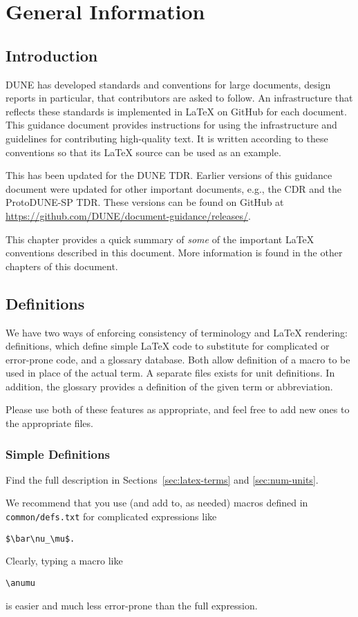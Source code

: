 \chapter{General Information}
\label{ch:gen}

\section{Introduction}

DUNE has developed standards and conventions for large documents, design reports in particular, that contributors are asked to follow. An infrastructure that reflects these standards is implemented in LaTeX on GitHub for each document. This guidance document provides instructions for using the infrastructure and guidelines for contributing high-quality text. It is written according to these conventions so that its \LaTeX{} source can be used as an example.  

This has been updated for the DUNE TDR. Earlier versions of this guidance document were updated for other important documents, e.g., the CDR and the ProtoDUNE-SP TDR.  These versions can be found on GitHub at \url{https://github.com/DUNE/document-guidance/releases/}.

This chapter provides a quick summary of \textit{some} of the important LaTeX conventions described in this document. More information is found in the other chapters of this document.

\section{Definitions}
We have two ways of enforcing consistency of terminology and LaTeX rendering: definitions, which define simple LaTeX code to substitute for complicated or error-prone code, and a glossary database. Both allow definition of a macro to be used in place of the actual term. A separate files exists for unit definitions. In addition, the glossary provides a definition of the given term or abbreviation. 

Please use both of these features as appropriate, and feel free to add new ones to the appropriate files.   
\subsection{Simple Definitions}
\begin{framed}
Find the full description in Sections~\ref{sec:latex-terms} and \ref{sec:num-units}.

We recommend that you use (and add to, as needed) macros defined in \texttt{common/defs.txt} for complicated expressions like 
\begin{verbatim}
$\bar\nu_\mu$.
\end{verbatim}
 Clearly, typing a macro like 
 \begin{verbatim}
\anumu
\end{verbatim} 
is easier and much less error-prone than the full expression.
\end{framed}

